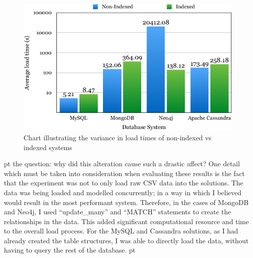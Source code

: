 \begin{figure}[H]\begin{center}\includegraphics[width=1\linewidth]{images/nonvsin}\caption{Chart illustrating the variance in load times of non-indexed vs indexed systems}\label{fig:nonvsin}\end{center}\end{figure}
 pt
the question: why did this alteration cause such a drastic affect? One detail which must be taken into consideration when evaluating these results is the fact that the experiment was not to only load raw CSV data into the solutions. The data was being loaded and modelled concurrently; in a way in which I believed would result in the most performant system. Therefore, in the cases of MongoDB and Neo4j, I used ``update\_many'' and ``MATCH'' statements to create the relationships in the data. This added significant computational resource and time to the overall load process. For the MySQL and Cassandra solutions, as I had already created the table structures, I was able to directly load the data, without having to query the rest of the database. pt

